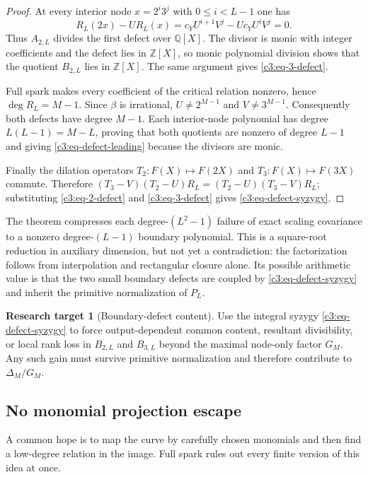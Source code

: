 \documentclass[11pt,oneside]{article}
\theoremstyle{definition}
\newtheorem{target}[theorem]{Research target}
\theoremstyle{remark}
\newcommand{\Z}{\mathbb Z}
\newcommand{\Q}{\mathbb Q}
\begin{document}
\begin{proof}
At every interior node $x=2^i3^j$ with $0\le i<L-1$ one has
\[
 R_L(2x)-UR_L(x)
 =c_YU^{i+1}V^j-Uc_YU^iV^j=0.
\]
Thus $A_{2,L}$ divides the first defect over $\Q[X]$.  The divisor is monic with integer
coefficients and the defect lies in $\Z[X]$, so monic polynomial division shows that the
quotient $B_{2,L}$ lies in $\Z[X]$.  The same argument gives \eqref{c3:eq-3-defect}.

Full spark makes every coefficient of the critical relation nonzero, hence
$\deg R_L=M-1$.  Since $\beta$ is irrational, $U\ne2^{M-1}$ and $V\ne3^{M-1}$.
Consequently both defects have degree $M-1$.  Each interior-node polynomial has degree
$L(L-1)=M-L$, proving that both quotients are nonzero of degree $L-1$ and giving
\eqref{c3:eq-defect-leading} because the divisors are monic.

Finally the dilation operators $T_2:F(X)\mapsto F(2X)$ and
$T_3:F(X)\mapsto F(3X)$ commute.  Therefore
$(T_3-V)(T_2-U)R_L=(T_2-U)(T_3-V)R_L$; substituting
\eqref{c3:eq-2-defect} and \eqref{c3:eq-3-defect} gives
\eqref{c3:eq-defect-syzygy}.
\end{proof}

The theorem compresses each degree-$(L^2-1)$ failure of exact scaling covariance to a
nonzero degree-$(L-1)$ boundary polynomial.  This is a square-root reduction in auxiliary
dimension, but not yet a contradiction: the factorization follows from interpolation and
rectangular closure alone.  Its possible arithmetic value is that the two small boundary
defects are coupled by \eqref{c3:eq-defect-syzygy} and inherit the primitive normalization
of $P_L$.

\begin{target}[Boundary-defect content]
Use the integral syzygy \eqref{c3:eq-defect-syzygy} to force output-dependent common content,
resultant divisibility, or local rank loss in $B_{2,L}$ and $B_{3,L}$ beyond the maximal
node-only factor $G_M$.  Any such gain must survive primitive normalization and therefore
contribute to $\Delta_M/G_M$.
\end{target}

\subsection{No monomial projection escape}

A common hope is to map the curve by carefully chosen monomials and then find a low-degree
relation in the image.  Full spark rules out every finite version of this idea at once.
\end{document}

